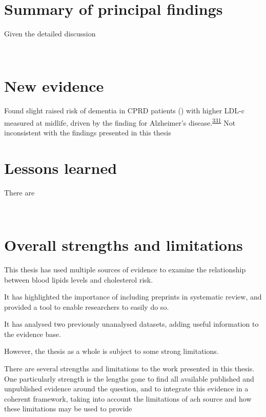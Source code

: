 \documentclass[a4paper, twoside]{templates/ociamthesis}
\begin{document}
~

\hypertarget{summary-of-principal-findings}{%
\section{Summary of principal findings}\label{summary-of-principal-findings}}

Given the detailed discussion

~

\hypertarget{new-evidence}{%
\section{New evidence}\label{new-evidence}}

Found slight raised risk of dementia in CPRD patients () with higher LDL-c measured at midlife, driven by the finding for Alzheimer's disease.\textsuperscript{\protect\hyperlink{ref-iwagami2021}{331}} Not inconsistent with the findings presented in this thesis

\hypertarget{lessons-learned}{%
\section{Lessons learned}\label{lessons-learned}}

There are

~

\hypertarget{overall-strengths-and-limitations}{%
\section{Overall strengths and limitations}\label{overall-strengths-and-limitations}}

This thesis has used multiple sources of evidence to examine the relationship between blood lipids levels and cholesterol risk.

It has highlighted the importance of including preprints in systematic review, and provided a tool to enable researchers to easily do so.

It has analysed two previously unanalysed datasets, adding useful information to the evidence base.

However, the thesis as a whole is subject to some strong limitations.

There are several strengths and limitations to the work presented in this thesis. One particularly strength is the lengths gone to find all available published and unpublished evidence around the question, and to integrate this evidence in a coherent framework, taking into account the limitations of ach source and how these limitations may be used to provide
\end{document}
